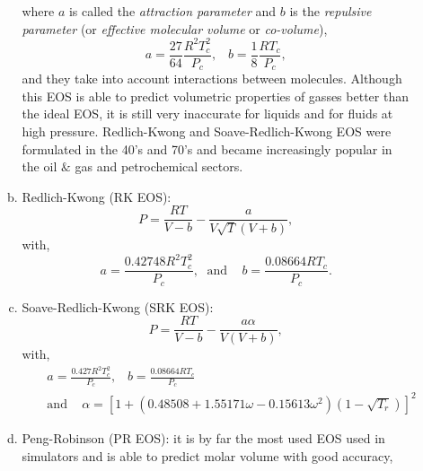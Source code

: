 \documentclass[12pts,a4paper,amsmath,amssymb,floatfix]{article}%
\newcommand{\frc}{\displaystyle\frac}
\begin{document}
\begin{enumerate}[i)]
\begin{enumerate}[a)]
\begin{enumerate}[c.1)]
\begin{equation}
                          \end{equation}
                          where $a$ is called the {\it attraction parameter} and $b$ is the {\it repulsive parameter} (or {\it effective molecular volume} or {\it co-volume}), 
                          \begin{displaymath}
                              a = \frc{27}{64}\frc{R^{2}T_{c}^{2}}{P_{c}},\;\;\; b = \frc{1}{8}\frc{R T_{c}}{P_{c}},
                          \end{displaymath}
                          and they take into account interactions between molecules. Although this EOS is able to predict volumetric properties of gasses better than the ideal EOS, it is still very inaccurate for liquids and for fluids at high pressure.  Redlich-Kwong and Soave-Redlich-Kwong EOS were formulated in the 40's and 70's and became increasingly popular in the oil $\&$ gas and petrochemical sectors. 
%
                      \item Redlich-Kwong (RK EOS):
                           \begin{equation}
                               P = \frc{R T}{V-b} - \frc{a}{V\sqrt{T}\left(V+b\right)},\label{Mod02_RKEOS}
                           \end{equation}
                           with,
                          \begin{displaymath}
                              a = \frc{0.42748 R^{2}T_{c}^{2}}{P_{c}},\; \text{ and }\;\;\; b = \frc{0.08664 R T_{c} }{P_{c}}.
                          \end{displaymath}
%
                      \item Soave-Redlich-Kwong (SRK EOS):
                           \begin{equation}
                               P = \frc{R T}{V-b} - \frc{a\alpha}{V\left(V+b\right)},\label{Mod02_SRKEOS}
                           \end{equation}
                           with,
                          \begin{eqnarray}
                              &&a = \frc{0.427 R^{2}T_{c}^{2}}{P_{c}},\;\;\;b = \frc{0.08664 R T_{c} }{P_{c}} \nonumber \\
                              &&\text{and }\;\;\; \alpha = \left[1 + \left( 0.48508 + 1.55171\omega - 0.15613\omega^{2}\right)\left(1-\sqrt{T_{r}}\right)\right]^{2}\nonumber
                          \end{eqnarray}                          
%
                      \item Peng-Robinson (PR EOS): it is by far the most used EOS used in simulators and is able to predict molar volume with good accuracy,

\end{enumerate}
\end{enumerate}
\end{enumerate}
\end{document}
